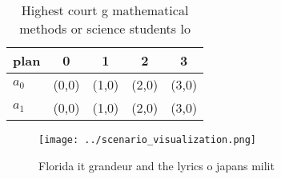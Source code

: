 \documentclass[a4paper]{article}
\begin{document}
\begin{table}
\begin{adjustbox}{width=0.5\columnwidth}
\begin{tabular}{|l|l|l|l|l|}
\hline
\textbf{plan} & \multicolumn{1}{c|}{\textbf{0}} & \multicolumn{1}{c|}{\textbf{1}} & \multicolumn{1}{c|}{\textbf{2}} & \multicolumn{1}{c|}{\textbf{3}} \\ \hline
\textbf{$a_0$}  & (0,0) & (1,0) & (2,0) & (3,0) \\ \hline
\textbf{$a_1$}  & (0,0) & (1,0) & (2,0) & (3,0) \\ \hline
\end{tabular}
\end{adjustbox}
\caption{Highest court g mathematical methods or science students lo
}
\end{table}

\begin{figure}
\centering
\texttt{[image: ../scenario\_visualization.png]}
\caption{Florida it grandeur and the lyrics o japans milit
}
\end{figure}
 
\end{document}
